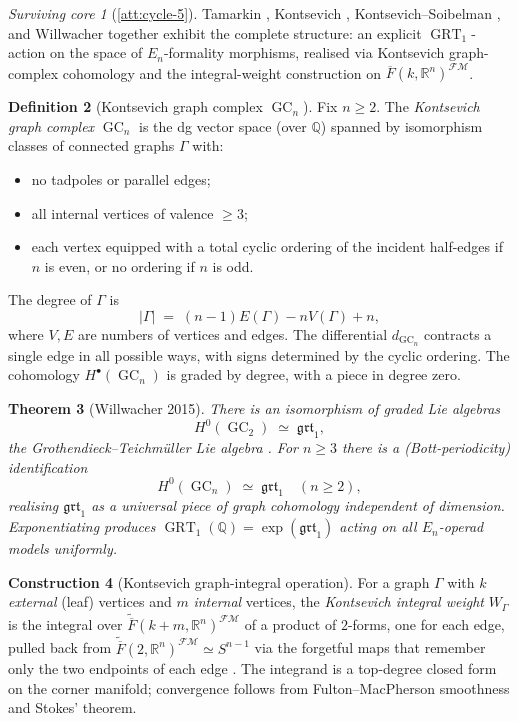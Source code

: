 \documentclass[11pt]{article}
\newtheorem{theorem}{Theorem}[section]
\theoremstyle{definition}
\newtheorem{definition}[theorem]{Definition}
\newtheorem{construction}[theorem]{Construction}
\theoremstyle{remark}
\newtheorem{survivor}[theorem]{Surviving core}
\DeclareMathOperator{\GC}{GC}
\DeclareMathOperator{\GRT}{GRT}
\newcommand{\FMbar}{\overline{F}}
\newcommand{\FM}{\mathcal{FM}}
\begin{document}
\begin{survivor}[\ref{att:cycle-5}]
Tamarkin \cite{Tamarkin2003}, Kontsevich \cite{Kontsevich2003},
Kontsevich--Soibelman \cite{KontsevichSoibelman2000-deformations},
and Willwacher \cite{Willwacher2015} together exhibit the complete
structure: an explicit $\GRT_1$-action on the space of
$E_n$-formality morphisms, realised via Kontsevich graph-complex
cohomology and the integral-weight construction on
$\FMbar(k, \mathbb{R}^n)^{\FM}$.
\end{survivor}

\begin{definition}[Kontsevich graph complex $\GC_n$]
\label{def:graph-complex}
Fix $n \geq 2$. The \emph{Kontsevich graph complex} $\GC_n$ is the dg
vector space (over $\mathbb{Q}$) spanned by isomorphism classes of
connected graphs $\Gamma$ with:
\begin{itemize}
 \item no tadpoles or parallel edges;
 \item all internal vertices of valence $\geq 3$;
 \item each vertex equipped with a total cyclic ordering of the incident
       half-edges if $n$ is even, or no ordering if $n$ is odd.
\end{itemize}
The degree of $\Gamma$ is
\[
 |\Gamma| \;=\; (n - 1) E(\Gamma) - n V(\Gamma) + n,
\]
where $V, E$ are numbers of vertices and edges. The differential
$d_{\GC_n}$ contracts a single edge in all possible ways, with signs
determined by the cyclic ordering. The cohomology $H^\bullet(\GC_n)$
is graded by degree, with a piece in degree zero.
\end{definition}

\begin{theorem}[Willwacher 2015]
\label{thm:willwacher}
There is an isomorphism of graded Lie algebras
\[
 H^0(\GC_2) \;\simeq\; \mathfrak{grt}_1,
\]
the Grothendieck--Teichm\"uller Lie algebra
\cite[Willwacher 2015, \emph{Invent.\ math.}\ 200, Thm.\ 1.1]{Willwacher2015}.
For $n \geq 3$ there is a (Bott-periodicity) identification
\[
 H^0(\GC_n) \;\simeq\; \mathfrak{grt}_1 \quad (n \geq 2),
\]
realising $\mathfrak{grt}_1$ as a universal piece of graph cohomology
independent of dimension. Exponentiating produces
$\GRT_1(\mathbb{Q}) = \exp(\mathfrak{grt}_1)$ acting on all $E_n$-operad
models uniformly.
\end{theorem}

\begin{construction}[Kontsevich graph-integral operation]
\label{constr:graph-integral}
For a graph $\Gamma$ with $k$ \emph{external} (leaf) vertices and $m$
\emph{internal} vertices, the \emph{Kontsevich integral weight}
$W_\Gamma$ is the integral over $\widetilde{\FMbar}(k + m, \mathbb{R}^n)^{\FM}$
of a product of $2$-forms, one for each edge, pulled back from
$\widetilde{\FMbar}(2, \mathbb{R}^n)^{\FM} \simeq S^{n-1}$ via the
forgetful maps that remember only the two endpoints of each edge
\cite[Kontsevich 2003, \S 6.4]{Kontsevich2003}. The integrand is a
top-degree closed form on the corner manifold; convergence follows
from Fulton--MacPherson smoothness and Stokes' theorem.
\end{construction}
\end{document}
